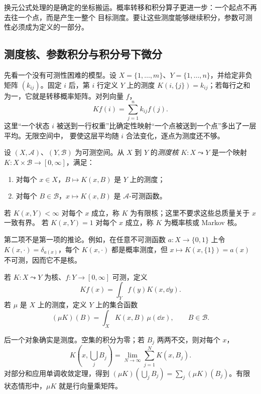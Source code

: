 换元公式处理的是确定的坐标搬运。概率转移和积分算子更进一步：一个起点不再去往一个点，而是产生一整个
目标测度。要让这些测度能够继续积分，参数可测性必须成为定义的一部分。

\subsection{测度核、参数积分与积分号下微分}\label{subsec:3-2-3}

先看一个没有可测性困难的模型。设 $X=\{1,\dots,m\}$、$Y=\{1,\dots,n\}$，并给定非负矩阵
$(k_{ij})$。固定 $i$ 后，第 $i$ 行定义 $Y$ 上的测度
$K(i,\{j\})=k_{ij}$；若每行之和为一，它就是转移概率矩阵。对列向量 $f$，
\[
 Kf(i)=\sum_{j=1}^nk_{ij}f(j).
\]
这里“一个状态 $i$ 被送到一行权重”比确定性映射“一个点被送到一个点”多出了一层平均。无限空间中，
要使这层平均随 $i$ 合法变化，逐点为测度还不够。

\begin{definition}[测度核]\label{def:3-2-3-1}
设 $(X,\mathcal A)$、$(Y,\mathcal B)$ 为可测空间。从 $X$ 到 $Y$ 的\emph{测度核}
$K:X\leadsto Y$ 是一个映射 $K:X\times\mathcal B\to[0,\infty]$，满足：
\begin{enumerate}
  \item 对每个 $x\in X$，$B\mapsto K(x,B)$ 是 $Y$ 上的测度；
  \item 对每个 $B\in\mathcal B$，$x\mapsto K(x,B)$ 是 $\mathcal A$-可测函数。
\end{enumerate}
若 $K(x,Y)<\infty$ 对每个 $x$ 成立，称 $K$ 为有限核；这里不要求这些总质量关于 $x$ 一致有界。
若 $K(x,Y)=1$ 对每个 $x$ 成立，称 $K$ 为概率核或 Markov 核。
\end{definition}

第二项不是第一项的推论。例如，在任意不可测函数 $a:X\to\{0,1\}$ 上令
$K(x,\cdot)=\delta_{a(x)}$，每个 $K(x,\cdot)$ 都是概率测度，但
$x\mapsto K(x,\{1\})=a(x)$ 不可测，因而它不是核。

\begin{definition}[核作用]\label{def:3-2-3-2}
若 $K:X\leadsto Y$ 为核、$f:Y\to[0,\infty]$ 可测，定义
\[
 Kf(x)=\int_Yf(y)K(x,\dd y).
\]
若 $\mu$ 是 $X$ 上的测度，定义 $Y$ 上的集合函数
\[
 (\mu K)(B)=\int_XK(x,B)\,\mu(\dd x),\qquad B\in\mathcal B.
\]
\end{definition}

后一个对象确实是测度。空集的积分为零；若 $B_j$ 两两不交，则对每个 $x$，
\[
 K\!\left(x,\bigcup_jB_j\right)
 =\lim_{N\to\infty}\sum_{j=1}^NK(x,B_j).
\]
对部分和应用单调收敛定理，得到
$(\mu K)(\bigcup_jB_j)=\sum_j(\mu K)(B_j)$。有限状态情形中，$\mu K$ 就是行向量乘矩阵。

